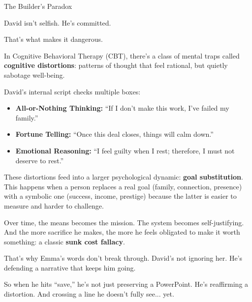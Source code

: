 \medskip

\begin{PsychologicalSidebar}{The Builder’s Paradox}

  David isn’t selfish. He’s committed.

  \medskip
  
  That’s what makes it dangerous.
  
  \medskip
  
  In Cognitive Behavioral Therapy (CBT), there’s a class of mental traps called \textbf{cognitive distortions}: 
  patterns of thought that feel rational, but quietly sabotage well-being.

  \medskip
  
  David’s internal script checks multiple boxes:

  \medskip
  
  \begin{itemize}
    \item \textbf{All-or-Nothing Thinking:} “If I don’t make this work, I’ve failed my family.”
    \item \textbf{Fortune Telling:} “Once this deal closes, things will calm down.”
    \item \textbf{Emotional Reasoning:} “I feel guilty when I rest; therefore, I must not deserve to rest.”
  \end{itemize}
  
  \medskip
  
  These distortions feed into a larger psychological dynamic:  
  \textbf{goal substitution}. This happens when a person replaces a real goal (family, connection, presence) 
  with a symbolic one (success, income, prestige) because the latter is easier to measure and harder to challenge.

  \medskip
  
  Over time, the means becomes the mission.  
  The system becomes self-justifying.  
  And the more sacrifice he makes, the more he feels obligated to make it worth something: a classic \textbf{sunk cost fallacy}.
  
  \medskip
  
  That’s why Emma’s words don’t break through.  
  David’s not ignoring her. He’s defending a narrative that keeps him going.
  
  \medskip
  
  So when he hits “save,” he’s not just preserving a PowerPoint.
  He’s reaffirming a distortion.  
  And crossing a line he doesn’t fully see... yet.
  
\end{PsychologicalSidebar}

